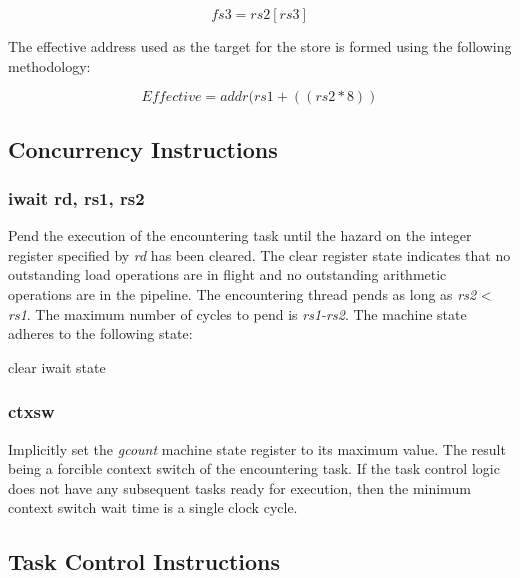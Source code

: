 \documentclass{article}
\begin{document}
\begin{equation}
fs3 = rs2[rs3]
\end{equation}

The effective address used as the target
for the store is formed using the following methodology:

\begin{equation}
Effective = addr(rs1 + ((rs2 * 8))
\end{equation}


\subsection{Concurrency Instructions}

\subsubsection{iwait rd, rs1, rs2}

Pend the execution of the encountering task until the hazard
on the integer register specified by \emph{rd} has been cleared. 
The clear register state indicates that no outstanding load 
operations are in flight and no outstanding arithmetic 
operations are in the pipeline.  The encountering thread
pends as long as \emph{rs2} < \emph{rs1}.  The maximum number of cycles to
pend is \emph{rs1-rs2}.  The machine state adheres to the following state: 

\begin{algorithm}[H]
 clear iwait state
\end{algorithm}

\subsubsection{ctxsw}

Implicitly set the \emph{gcount} machine state register
to its maximum value.  The result being a forcible context
switch of the encountering task.  If the task control logic
does not have any subsequent tasks ready for execution, then the
minimum context switch wait time is a single clock cycle.  

\subsection{Task Control Instructions}
\end{document}
